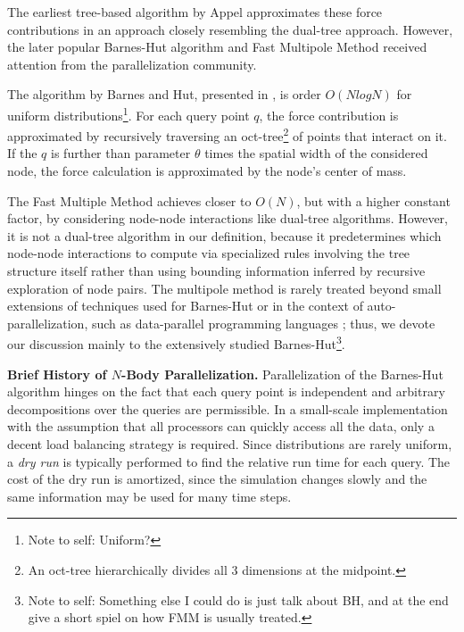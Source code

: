\documentclass[times, leqno,twocolumn]{article}
\newcommand{\authornote}[1]{\footnote{Note to self: #1}}
\begin{document}
The earliest tree-based algorithm by Appel \cite{appel_alg} approximates these force contributions in an approach closely resembling the dual-tree approach.
However, the later popular Barnes-Hut algorithm\cite{barnes_hut} and Fast Multipole Method\cite{greengard_fmm} received attention from the parallelization community.

The algorithm by Barnes and Hut, presented in \cite{barnes_hut}, is order $O(N log N)$ for uniform distributions\authornote{Uniform?}.
For each query point $q$, the force contribution is approximated by recursively traversing an oct-tree\footnote{An oct-tree hierarchically divides all 3 dimensions at the midpoint.} of points that interact on it.
If the $q$ is further than parameter $\theta$ times the spatial width of the considered node, the force calculation is approximated by the node's center of mass.

The Fast Multiple Method \cite{greengard_fmm} achieves closer to $O(N)$, but with a higher constant factor, by considering node-node interactions like dual-tree algorithms.
However, it is not a dual-tree algorithm in our definition, because it predetermines which node-node interactions to compute via specialized rules involving the tree structure itself rather than using bounding information inferred by recursive exploration of node pairs.
The multipole method is rarely treated beyond small extensions of techniques used for Barnes-Hut \cite{singh95load} or in the context of auto-parallelization, such as data-parallel programming languages \cite{nyland93dataparallel} \cite{washington_nesl}; thus, we devote our discussion mainly to the extensively studied Barnes-Hut\authornote{Something else I could do is just talk about BH, and at the end give a short spiel on how FMM is usually treated.}.


{\bf Brief History of $N$-Body Parallelization.}
Parallelization of the Barnes-Hut algorithm hinges on the fact that each query point is independent and arbitrary decompositions over the queries are permissible.
In a small-scale implementation with the assumption that all processors can quickly access all the data, only a decent load balancing strategy is required.
Since distributions are rarely uniform, a {\it dry run} is typically performed to find the relative run time for each query.
The cost of the dry run is amortized, since the simulation changes slowly and the same information may be used for many time steps.
\end{document}
